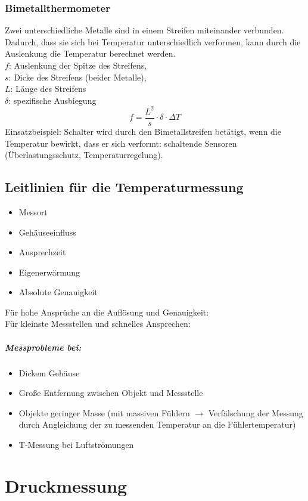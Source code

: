 \subsection{Bimetallthermometer}
Zwei unterschiedliche Metalle sind in einem Streifen miteinander verbunden. Dadurch, dass sie sich bei Temperatur unterschiedlich verformen, kann durch die Auslenkung die Temperatur berechnet werden.\\
$f$: Auslenkung der Spitze des Streifens,\\
$s$: Dicke des Streifens (beider Metalle),\\
$L$: Länge des Streifens\\
$\delta$: spezifische Ausbiegung
$$f=\frac{L^2}{s}\cdot \delta \cdot \Delta T$$
Einsatzbeispiel: Schalter wird durch den Bimetallstreifen betätigt, wenn die Temperatur bewirkt, dass er sich verformt: schaltende Sensoren (Überlastungsschutz, Temperaturregelung).

\section{Leitlinien für die Temperaturmessung}
\begin{itemize}
\item Messort
\item Gehäuseeinfluss
\item Ansprechzeit
\item Eigenerwärmung
\item Absolute Genauigkeit
\end{itemize}
Für hohe Ansprüche an die Auflösung und Genauigkeit: \\
Für kleinste Messstellen und schnelles Ansprechen: 
\paragraph{Messprobleme bei:}
\begin{itemize}
\item Dickem Gehäuse
\item Große Entfernung zwischen Objekt und Messstelle
\item Objekte geringer Masse (mit massiven Fühlern $\to$ Verfälschung der Messung durch Angleichung der zu messenden Temperatur an die Fühlertemperatur)
\item T-Messung bei Luftströmungen
\end{itemize}

\chapter{Druckmessung}
